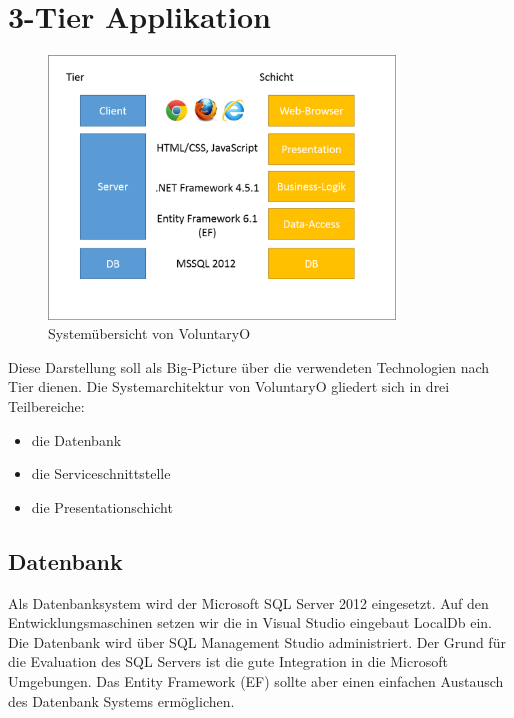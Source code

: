 	\section{3-Tier Applikation}
		\begin{figure}
	  		\vspace{-25pt}
		  	\begin{center}
	    		\includegraphics[height=7cm]{content/architekturdokumentation/images/systemarchitektur.png}
		  	\end{center}
	  		\vspace{-20pt}
		 	\caption{Systemübersicht von VoluntaryO}
		\end{figure}
	    Diese Darstellung soll als Big-Picture über die verwendeten Technologien nach Tier dienen.
		Die Systemarchitektur von VoluntaryO gliedert sich in drei Teilbereiche: 
		\\\begin{itemize}
			\item die Datenbank
			\item die Serviceschnittstelle
			\item die Presentationschicht
		\end{itemize}

	  	\vspace{3cm}
		\subsection{Datenbank}
		Als Datenbanksystem wird der Microsoft SQL Server 2012 eingesetzt. Auf den Entwicklungsmaschinen setzen wir die in Visual Studio eingebaut LocalDb ein. Die Datenbank wird über SQL Management Studio administriert. Der Grund für die Evaluation des SQL Servers ist die gute Integration in die Microsoft Umgebungen. Das Entity Framework (EF) sollte aber einen einfachen Austausch des Datenbank Systems ermöglichen.
